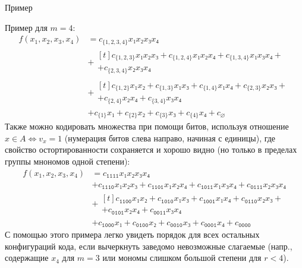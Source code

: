 \documentclass[beameroptions={aspectratio=169}]{beamerswitch}
\begin{document}
\begin{frame}{Пример}
\begin{nonspeaker}
{        Пример для $m=4$:
        \begin{align*}
            f(x_1, x_2, x_3, x_4)
                & = c_{\{1,2,3,4\}} x₁x₂x₃x₄ \\
                & + \begin{multlined}[t]
                    c_{\{1,2,3\}} x₁x₂x₃ + c_{\{1,2,4\}} x₁x₂x₄ + c_{\{1,3,4\}} x₁x₃x₄ +{} \\
                    + c_{\{2,3,4\}} x₂x₃x₄
                \end{multlined}\\
                & + \begin{multlined}[t]
                    c_{\{1,2\}} x₁x₂ + c_{\{1,3\}} x₁x₃ + c_{\{1,4\}} x₁x₄ + c_{\{2,3\}} x₂x₃ + {}\\
                    + c_{\{2,4\}} x₂x₄ + c_{\{3,4\}} x₃x₄
                \end{multlined}\\
                & + c_{\{1\}} x₁ + c_{\{2\}} x₂ + c_{\{3\}} x₃ + c_{\{4\}} x₄ + c_{\varnothing}
        \end{align*}
        Также можно кодировать множества при помощи битов, используя отношение $x∈A \Longleftrightarrow v_x = 1$ (нумерация битов слева направо, начиная с единицы), где свойство остортированности сохраняется и хорошо видно (но только в пределах группы мнономов одной степени):
        \begin{align*}
            f(x_1, x_2, x_3, x_4)
                &= c_{\mathtt{1111}} x₁x₂x₃x₄ \\
                &+ c_{\mathtt{1110}} x₁x₂x₃ + c_{\mathtt{1101}} x₁x₂x₄ + c_{\mathtt{1011}} x₁x₃x₄ + c_{\mathtt{0111}} x₂x₃x₄ \\
                &+ \begin{multlined}[t]
                    c_{\mathtt{1100}} x₁x₂ + c_{\mathtt{1010}} x₁x₃ + c_{\mathtt{1001}} x₁x₄ + c_{\mathtt{0110}} x₂x₃ + {} \\
                        + c_{\mathtt{0101}} x₂x₄ + c_{\mathtt{0011}} x₃x₄
                \end{multlined}\\
                &+ c_{\mathtt{1000}} x₁ + c_{\mathtt{0100}} x₂ + c_{\mathtt{0010}} x₃ + c_{\mathtt{0001}} x₄ + c_\mathtt{0000}
        \end{align*}
        С помощью этого примера легко увидеть порядок для всех остальных конфигураций кода, если вычеркнуть заведомо невозможные слагаемые (напр., содержащие $x_4$ для $m=3$ или мономы слишком большой степени для $r < 4$).
    
}
\end{nonspeaker}
\end{frame}
\end{document}

